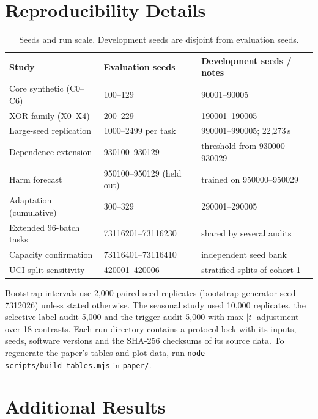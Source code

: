 \section{Reproducibility Details}
\begin{table}[h]
\centering
\caption{Seeds and run scale. Development seeds are disjoint from evaluation seeds.}
\label{tab:repro}
\footnotesize
\setlength{\tabcolsep}{3pt}
\begin{tabular}{p{2.6cm}p{2.5cm}p{2.7cm}}
\toprule
Study & Evaluation seeds & Development seeds / notes \\
\midrule
Core synthetic (C0--C6) & 100--129 & 90001--90005 \\
XOR family (X0--X4) & 200--229 & 190001--190005 \\
Large-seed replication & 1000--2499 per task & 990001--990005; 22,273\,s \\
Dependence extension & 930100--930129 & threshold from 930000--930029 \\
Harm forecast & 950100--950129 (held out) & trained on 950000--950029 \\
Adaptation (cumulative) & 300--329 & 290001--290005 \\
Extended 96-batch tasks & 73116201--73116230 & shared by several audits \\
Capacity confirmation & 73116401--73116410 & independent seed bank \\
UCI split sensitivity & 420001--420006 & stratified splits of cohort 1 \\
\bottomrule
\end{tabular}
\end{table}

Bootstrap intervals use 2,000 paired seed replicates (bootstrap generator seed 7312026)
unless stated otherwise. The seasonal study used 10,000 replicates, the selective-label
audit 5,000 and the trigger audit 5,000 with max-$|t|$ adjustment over 18 contrasts.
Each run directory contains a protocol lock with its inputs, seeds, software versions
and the SHA-256 checksums of its source data. To regenerate the paper's tables and
plot data, run \texttt{node scripts/build\_tables.mjs} in \texttt{paper/}.

\section{Additional Results}
\label{app:extra}






